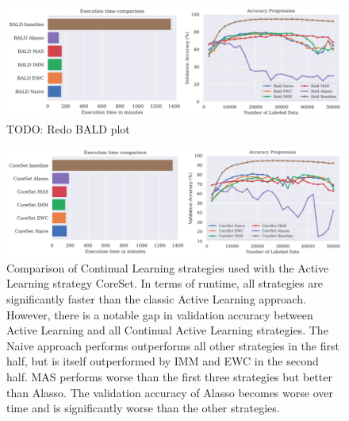 \begin{figure} [ht]
    \centering
    \includegraphics[width=\linewidth]{images/results_CAL/Bald_CAL_2000b.png}
    \caption[Continual Active Learning BALD 2000 batch size]{TODO: Redo BALD plot}
    \label{fig:Evaluation:Results:CAL:BALD2000}
\end{figure}

\begin{figure} [ht]
    \centering
    \includegraphics[width=\linewidth]{images/results_CAL/CoreSet_CAL_2000b.png}
    \caption[Continual Active Learning CoreSet 2000 batch size]{Comparison of Continual Learning strategies used with the Active Learning strategy CoreSet. In terms of runtime, all
    strategies are significantly faster than the classic Active Learning approach. However, there is a notable gap in validation accuracy between Active Learning and all Continual
    Active Learning strategies. The Naive approach performs outperforms all other strategies in the first half, but is itself outperformed by IMM and EWC in the second half. MAS performs
    worse than the first three strategies but better than Alasso. The validation accuracy of Alasso becomes worse over time and is significantly worse than the other strategies.}
    \label{fig:Evaluation:Results:CAL:CoreSet2000}
\end{figure}


